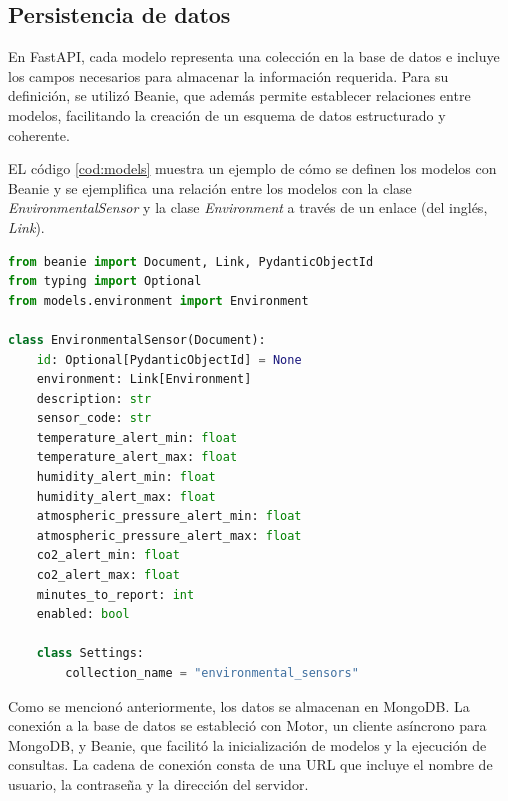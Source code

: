 \subsection{Persistencia de datos}
En FastAPI, cada modelo representa una colección en la base de datos e incluye
los campos necesarios para almacenar la información requerida. Para su
definición, se utilizó Beanie, que además permite establecer relaciones entre
modelos, facilitando la creación de un esquema de datos estructurado y
coherente.

EL código \ref{cod:models} muestra un ejemplo de cómo se definen los modelos
con Beanie y se ejemplifica una relación entre los modelos con la clase
\textit{EnvironmentalSensor} y la clase \textit{Environment} a través de un
enlace (del inglés, \textit{Link}).

\begin{lstlisting}[label=cod:models,caption=Ejemplo de definición de modelos con Beanie, language=Python]
from beanie import Document, Link, PydanticObjectId
from typing import Optional
from models.environment import Environment

class EnvironmentalSensor(Document):
    id: Optional[PydanticObjectId] = None 
    environment: Link[Environment]
    description: str
    sensor_code: str
    temperature_alert_min: float
    temperature_alert_max: float
    humidity_alert_min: float
    humidity_alert_max: float
    atmospheric_pressure_alert_min: float
    atmospheric_pressure_alert_max: float
    co2_alert_min: float
    co2_alert_max: float
    minutes_to_report: int
    enabled: bool
    
    class Settings:
        collection_name = "environmental_sensors"
\end{lstlisting}

Como se mencionó anteriormente, los datos se almacenan en MongoDB. La conexión
a la base de datos se estableció con Motor, un cliente asíncrono para MongoDB,
y Beanie, que facilitó la inicialización de modelos y la ejecución de
consultas. La cadena de conexión consta de una URL que incluye el nombre de
usuario, la contraseña y la dirección del servidor.

